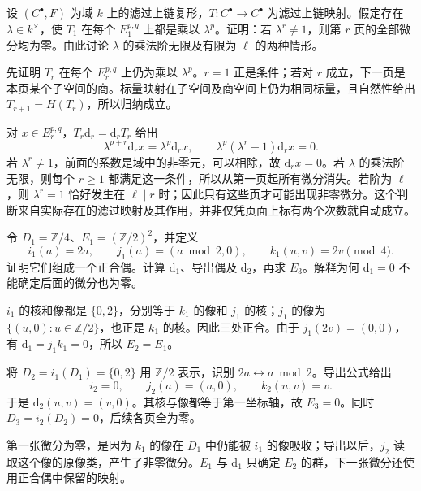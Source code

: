 \begin{exercise}\label{g2:ex:spectral-sequence-weight-vanishing}
	设 \((C^\bullet,F)\) 为域 \(k\) 上的滤过上链复形，\(T:C^\bullet\to C^\bullet\) 为滤过上链映射。假定存在 \(\lambda\in k^\times\)，使 \(T_1\) 在每个 \(E_1^{p,q}\) 上都是乘以 \(\lambda^p\)。证明：若 \(\lambda^r\ne1\)，则第 \(r\) 页的全部微分均为零。由此讨论 \(\lambda\) 的乘法阶无限及有限为 \(\ell\) 的两种情形。
\end{exercise}
\begin{solution}
	先证明 \(T_r\) 在每个 \(E_r^{p,q}\) 上仍为乘以 \(\lambda^p\)。\(r=1\) 正是条件；若对 \(r\) 成立，下一页是本页某个子空间的商。标量映射在子空间及商空间上仍为相同标量，且自然性给出 \(T_{r+1}=H(T_r)\)，所以归纳成立。

	对 \(x\in E_r^{p,q}\)，\(T_r\mathrm d_r=\mathrm d_rT_r\) 给出
	\[
		\lambda^{p+r}\mathrm d_rx=\lambda^p\mathrm d_rx,
		\qquad\lambda^p(\lambda^r-1)\mathrm d_rx=0.
	\]
	若 \(\lambda^r\ne1\)，前面的系数是域中的非零元，可以相除，故 \(\mathrm d_rx=0\)。若 \(\lambda\) 的乘法阶无限，则每个 \(r\ge1\) 都满足这一条件，所以从第一页起所有微分消失。若阶为 \(\ell\)，则 \(\lambda^r=1\) 恰好发生在 \(\ell\mid r\) 时；因此只有这些页才可能出现非零微分。这个判断来自实际存在的滤过映射及其作用，并非仅凭页面上标有两个次数就自动成立。
\end{solution}

\begin{exercise}\label{g2:ex:derived-couple-delayed-differential}
	令 \(D_1=\mathbb Z/4\)、\(E_1=(\mathbb Z/2)^2\)，并定义
	\[
		i_1(a)=2a,\qquad j_1(a)=(a\bmod2,0),\qquad k_1(u,v)=2v\pmod4.
	\]
	证明它们组成一个正合偶。计算 \(\mathrm d_1\)、导出偶及 \(\mathrm d_2\)，再求 \(E_3\)。解释为何 \(\mathrm d_1=0\) 不能确定后面的微分也为零。
\end{exercise}
\begin{solution}
	\(i_1\) 的核和像都是 \(\{0,2\}\)，分别等于 \(k_1\) 的像和 \(j_1\) 的核；\(j_1\) 的像为 \(\{(u,0):u\in\mathbb Z/2\}\)，也正是 \(k_1\) 的核。因此三处正合。由于 \(j_1(2v)=(0,0)\)，有 \(\mathrm d_1=j_1k_1=0\)，所以 \(E_2=E_1\)。

	将 \(D_2=i_1(D_1)=\{0,2\}\) 用 \(\mathbb Z/2\) 表示，识别 \(2a\leftrightarrow a\bmod2\)。导出公式给出
	\[
		i_2=0,\qquad j_2(a)=(a,0),\qquad k_2(u,v)=v.
	\]
	于是 \(\mathrm d_2(u,v)=(v,0)\)。其核与像都等于第一坐标轴，故 \(E_3=0\)。同时 \(D_3=i_2(D_2)=0\)，后续各页全为零。

	第一张微分为零，是因为 \(k_1\) 的像在 \(D_1\) 中仍能被 \(i_1\) 的像吸收；导出以后，\(j_2\) 读取这个像的原像类，产生了非零微分。\(E_1\) 与 \(\mathrm d_1\) 只确定 \(E_2\) 的群，下一张微分还使用正合偶中保留的映射。
\end{solution}

